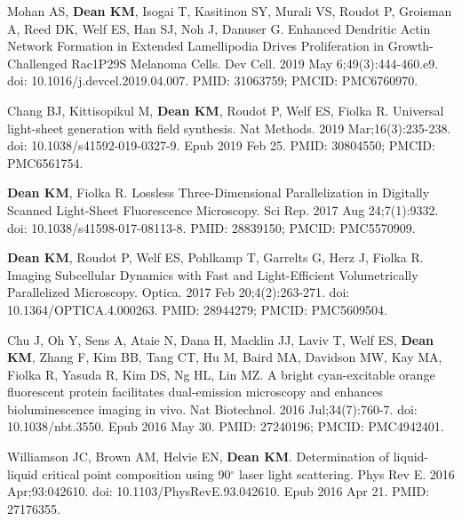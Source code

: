 \begin{etaremune}
\item Mohan AS, \textbf{Dean KM}, Isogai T, Kasitinon SY, Murali VS, Roudot P, Groisman A, Reed DK, Welf ES, Han SJ, Noh J, Danuser G. Enhanced Dendritic Actin Network Formation in Extended Lamellipodia Drives Proliferation in Growth-Challenged Rac1P29S Melanoma Cells. Dev Cell. 2019 May 6;49(3):444-460.e9. doi: 10.1016/j.devcel.2019.04.007. PMID: 31063759; PMCID: PMC6760970.

\item Chang BJ, Kittisopikul M, \textbf{Dean KM}, Roudot P, Welf ES, Fiolka R. Universal light-sheet generation with field synthesis. Nat Methods. 2019 Mar;16(3):235-238. doi: 10.1038/s41592-019-0327-9. Epub 2019 Feb 25. PMID: 30804550; PMCID: PMC6561754.

\item \textbf{Dean KM}, Fiolka R. Lossless Three-Dimensional Parallelization in Digitally Scanned Light-Sheet Fluorescence Microscopy. Sci Rep. 2017 Aug 24;7(1):9332. doi: 10.1038/s41598-017-08113-8. PMID: 28839150; PMCID: PMC5570909.

\item \textbf{Dean KM}, Roudot P, Welf ES, Pohlkamp T, Garrelts G, Herz J, Fiolka R. Imaging Subcellular Dynamics with Fast and Light-Efficient Volumetrically Parallelized Microscopy. Optica. 2017 Feb 20;4(2):263-271. doi: 10.1364/OPTICA.4.000263. PMID: 28944279; PMCID: PMC5609504.

\item Chu J, Oh Y, Sens A, Ataie N, Dana H, Macklin JJ, Laviv T, Welf ES, \textbf{Dean KM}, Zhang F, Kim BB, Tang CT, Hu M, Baird MA, Davidson MW, Kay MA, Fiolka R, Yasuda R, Kim DS, Ng HL, Lin MZ. A bright cyan-excitable orange fluorescent protein facilitates dual-emission microscopy and enhances bioluminescence imaging in vivo. Nat Biotechnol. 2016 Jul;34(7):760-7. doi: 10.1038/nbt.3550. Epub 2016 May 30. PMID: 27240196; PMCID: PMC4942401.

\item Williamson JC, Brown AM, Helvie EN, \textbf{Dean KM}. Determination of liquid-liquid critical point composition using 90$^\circ$ laser light scattering. Phys Rev E. 2016 Apr;93:042610. doi: 10.1103/PhysRevE.93.042610. Epub 2016 Apr 21. PMID: 27176355.


\end{etaremune}
